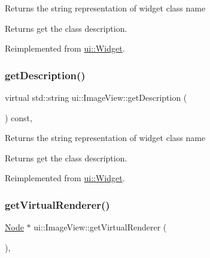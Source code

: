 Returns the string representation of widget class name \begin{DoxyReturn}{Returns}
get the class description. 
\end{DoxyReturn}


Reimplemented from \hyperlink{classui_1_1Widget_ad85abdaa9133dc6b8efc32670ae9b93f}{ui\+::\+Widget}.

\mbox{\label{classui_1_1ImageView_a1153b5455bf7efddac3fe5beb8c46b57}} 
\subsubsection{\texorpdfstring{get\+Description()}{getDescription()}\hspace{0.1cm}{\footnotesize\ttfamily [2/2]}}
{\footnotesize\ttfamily virtual std\+::string ui\+::\+Image\+View\+::get\+Description (\begin{DoxyParamCaption}{ }\end{DoxyParamCaption}) const\hspace{0.3cm}{\ttfamily [override]}, {\ttfamily [virtual]}}

Returns the string representation of widget class name \begin{DoxyReturn}{Returns}
get the class description. 
\end{DoxyReturn}


Reimplemented from \hyperlink{classui_1_1Widget_ad85abdaa9133dc6b8efc32670ae9b93f}{ui\+::\+Widget}.

\mbox{\label{classui_1_1ImageView_adffa0c091b7d528ffc50c7b117be61bc}} 
\subsubsection{\texorpdfstring{get\+Virtual\+Renderer()}{getVirtualRenderer()}\hspace{0.1cm}{\footnotesize\ttfamily [1/2]}}
{\footnotesize\ttfamily \hyperlink{classNode}{Node} $\ast$ ui\+::\+Image\+View\+::get\+Virtual\+Renderer (\begin{DoxyParamCaption}{ }\end{DoxyParamCaption})\hspace{0.3cm}{\ttfamily [override]}, {\ttfamily [virtual]}}

